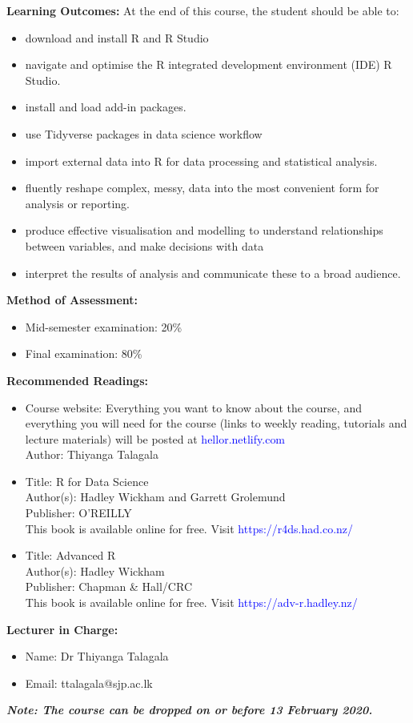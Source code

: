 \documentclass[a4paper,12pt]{article}
\begin{document}
\noindent\textbf{Learning Outcomes:}
At the end of this course, the student should be able to:
\begin{itemize}
	\setlength\itemsep{0.1mm}
\item download and install R and R Studio
\item navigate and optimise the R integrated development environment (IDE) R Studio.
\item install and load add-in packages.
\item use Tidyverse packages in data science workflow 
\item import external data into R for data processing and statistical analysis.
\item fluently reshape complex, messy, data into the most convenient form for analysis or reporting.
\item produce effective visualisation and modelling to understand relationships between variables, and make decisions with data
\item interpret the results of analysis and communicate these to a broad audience.

\end{itemize}

\noindent\textbf{Method of Assessment:}
\begin{itemize}
	\setlength\itemsep{0.1mm}
	\item Mid-semester examination: 20\%
	\item Final examination: 80\%
\end{itemize}

\noindent\textbf{Recommended Readings:}
\begin{itemize}
	\setlength\itemsep{0.1mm}
	\item Course website: Everything you want to know about the course, and everything you will need for the course (links to weekly reading, tutorials and lecture materials) will be posted at \textcolor{blue}{hellor.netlify.com}\\
	Author: Thiyanga Talagala
	\item Title: R for Data Science \\
		  Author(s): Hadley Wickham and Garrett Grolemund \\
		  Publisher: O'REILLY \\
		  This book is available online for free. Visit \textcolor{blue}{https://r4ds.had.co.nz/}
		\item Title: Advanced R \\
		  Author(s): Hadley Wickham \\
		  Publisher: Chapman \& Hall/CRC \\
		  This book is available online for free. Visit \textcolor{blue}{https://adv-r.hadley.nz/}
\end{itemize}

\noindent\textbf{Lecturer in Charge:}

\begin{itemize}
	\setlength\itemsep{0.1mm}
	\item[] Name: Dr Thiyanga  Talagala
	\item[] Email: ttalagala@sjp.ac.lk
\end{itemize}


\noindent\textbf{\textit{Note: The course can be dropped on or before 13 February 2020.}}
\end{document}
